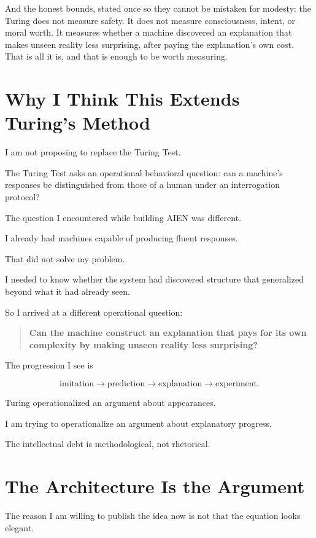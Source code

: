 \documentclass[11pt]{article}
\begin{document}
And the honest bounds, stated once so they cannot be mistaken for modesty: the Turing does not measure safety. It does not measure consciousness, intent, or moral worth. It measures whether a machine discovered an explanation that makes unseen reality less surprising, after paying the explanation's own cost. That is all it is, and that is enough to be worth measuring.

\section{Why I Think This Extends Turing's Method}

I am not proposing to replace the Turing Test.

The Turing Test asks an operational behavioral question: can a machine's responses be distinguished from those of a human under an interrogation protocol?~\cite{turing1950}

The question I encountered while building AIEN was different.

I already had machines capable of producing fluent responses.

That did not solve my problem.

I needed to know whether the system had discovered structure that generalized beyond what it had already seen.

So I arrived at a different operational question:

\begin{quote}
\textbf{Can the machine construct an explanation that pays for its own complexity by making unseen reality less surprising?}
\end{quote}

The progression I see is

\[
\text{imitation}
\rightarrow
\text{prediction}
\rightarrow
\text{explanation}
\rightarrow
\text{experiment}.
\]

Turing operationalized an argument about appearances.

I am trying to operationalize an argument about explanatory progress.

The intellectual debt is methodological, not rhetorical.

\section{The Architecture Is the Argument}

The reason I am willing to publish the idea now is not that the equation looks elegant.
\end{document}
